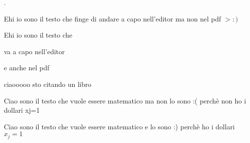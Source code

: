 .

Ehi io sono il testo che
finge di andare a capo nell'editor ma non nel pdf $>:)$

\vspace{2cm}

Ehi io sono il testo che

va a capo nell'editor 

e anche nel pdf 

\vspace{2cm}
ciaooooo sto citando un libro \cite{eco2017come}

\vspace{2cm}
Ciao sono il testo che vuole essere matematico ma non lo sono :( perchè non ho i dollari xj=1

Ciao sono il testo che vuole essere matematico e lo sono :) perchè ho i dollari  $x_j=1$




